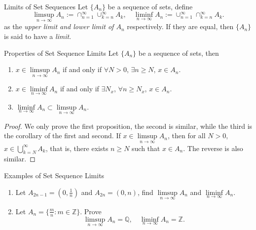 \begin{definition}{Limits of Set Sequences}{}
  Let $\{A_n\}$ be a sequence of sets,
  define
  \begin{equation}
    \limsup \limits_{n \rightarrow \infty} A_n := \cap _{n = 1}^{\infty}
    \cup _{k = n} ^{\infty} A_k, \quad
    \liminf \limits_{n \rightarrow \infty} A_n := \cup _{n = 1}^{\infty}
    \cap _{k = n}^{\infty}A_k.
  \end{equation}
  as the \emph{upper limit and lower limit of $A_n$} respectively.
  If they are equal, then $\{A_n\}$ is said to have a \emph{limit}.
\end{definition}

\begin{proposition}{Properties of Set Sequence Limits}{}
  Let $\{A_n\}$ be a sequence of sets, then
  \begin{enumerate}
  \item $x \in \limsup \limits_{n \rightarrow \infty} A_n$ if and only if
    $\forall N > 0$, $\exists n \geq N$, $x \in A_n$.
  \item $x \in \liminf \limits_{n \rightarrow \infty} A_n$ if and only if
    $\exists N_x$, $\forall n \geq N_x$, $x \in A_n$.
  \item $\liminf \limits_{n \rightarrow \infty} A_n \subset \limsup \limits_{n
      \rightarrow \infty} A_n$.
  \end{enumerate}
\end{proposition}

\begin{proof}
  We only prove the first proposition, the second is similar,
  while the third is the corollary of the first and second.
  If $x \in \limsup\limits_{n \rightarrow \infty}A_n$,
  then for all $N > 0$, $x \in \bigcup \limits_{k = N}^{\infty}A_k$,
  that is, there exists $n \geq N$ such that $x \in A_n$.
  The reverse is also similar.
\end{proof}

\begin{example}{Examples of Set Sequence Limits}{}
  \begin{enumerate}
  \item Let $A_{2n-1} = (0, \frac{1}{n})$ and $A_{2n} = (0, n)$, find
    $\limsup \limits_{n \rightarrow \infty} A_n$ and $\liminf \limits_{n \rightarrow \infty} A_n$.
  \item Let $A_n = \{\frac{m}{n}: m \in \mathbb{Z}\}$. Prove
    \begin{equation}
      \limsup \limits_{n \rightarrow \infty} A_n = \mathbb{Q}, \quad
      \liminf \limits_{n \rightarrow \infty} A_n = \mathbb{Z}.
    \end{equation}
  \end{enumerate}
\end{example}


